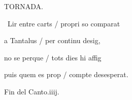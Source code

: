 \documentclass[12pt]{article}
\begin{document}
\begin{estrofaExtra}%




\begin{tornada}

\pagina{[146v]} TORNADA.

\end{tornada}


\end{estrofaExtra}


\begin{estrofa}

 \textparagraph\  Lir entre carts / propri so comparat

 a Tantalus / per continu desig,

 no se perque / tots dies hi affig

 puis quem es prop / compte desesperat.

\end{estrofa}



\begin{estrofaExtra}%

\begin{final}

Fin del Canto.iiij.

\end{final}

\end{estrofaExtra}
\end{document}

